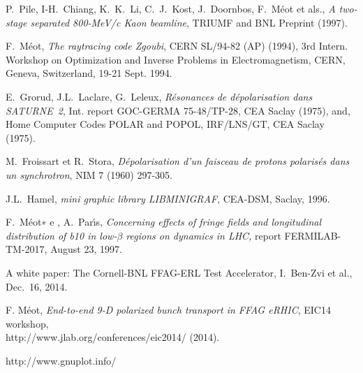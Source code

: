 \begin{thebibliography}{99}
P.~Pile, I-H.~Chiang, K.~K.~Li, C.~J.~Kost, J.~Doornbos, F.~M\'eot et als., 
\textsl{A two-stage separated 800-MeV/c Kaon beamline}, 
 TRIUMF and BNL Preprint (1997).

F.~M\'eot, 
\textsl{The raytracing code Zgoubi}, CERN SL/94-82 (AP) (1994), 
3rd Intern. Workshop on Optimization and Inverse Problems 
in Electromagnetism, CERN, Geneva, Switzerland, 19-21 Sept. 1994. 



\newpage



E.~Grorud, J.L.~Laclare, G.~Leleux, 
\textsl{R\'esonances de d\'epolarisation dans SATURNE~2}, 
Int. report GOC-GERMA 75-48/TP-28, CEA Saclay (1975), 
and, Home Computer Codes POLAR and POPOL, IRF/LNS/GT, CEA Saclay (1975).

M.~Froissart et R.~Stora, 
\textsl{D\'epolarisation d'un faisceau de protons polaris\'es dans un synchrotron},
 NIM 7 (1960) 297-305.

J.L.~Hamel, 
\textsl{mini graphic library LIBMINIGRAF}, 
CEA-DSM, Saclay, 1996.

F.~M\'eot∗ e , A.~Par\'{\i}s, 
\textsl{Concerning effects of fringe fields and longitudinal distribution of b10 in
low-$\beta$ regions on dynamics in LHC, } 
report FERMILAB-TM-2017, August 23, 1997. 

A white paper: The Cornell-BNL FFAG-ERL Test Accelerator, 
I.~Ben-Zvi et al., 
Dec.~16, 2014. 

F. M\'eot, 
\textsl{End-to-end 9-D polarized bunch transport in FFAG eRHIC}, 
EIC14 workshop, \\
http://www.jlab.org/conferences/eic2014/ (2014). 

http://www.gnuplot.info/

\end{thebibliography}



